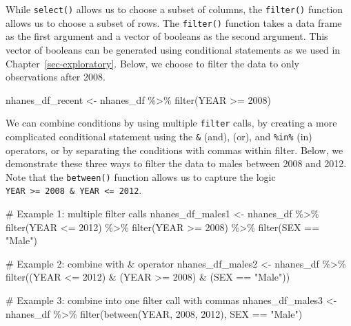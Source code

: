 \documentclass[
  letterpaper,
]{krantz}
\makeatletter
\newenvironment{Shaded}{\begin{snugshade}}{\end{snugshade}}
\newcommand{\CommentTok}[1]{\textcolor[rgb]{0.37,0.37,0.37}{#1}}
\newcommand{\DecValTok}[1]{\textcolor[rgb]{0.68,0.00,0.00}{#1}}
\newcommand{\FunctionTok}[1]{\textcolor[rgb]{0.28,0.35,0.67}{#1}}
\newcommand{\NormalTok}[1]{\textcolor[rgb]{0.00,0.23,0.31}{#1}}
\newcommand{\OtherTok}[1]{\textcolor[rgb]{0.00,0.23,0.31}{#1}}
\newcommand{\SpecialCharTok}[1]{\textcolor[rgb]{0.37,0.37,0.37}{#1}}
\newcommand{\StringTok}[1]{\textcolor[rgb]{0.13,0.47,0.30}{#1}}
\newenvironment{kframe}{%
\medskip{}
\setlength{\fboxsep}{.8em}
 \def\at@end@of@kframe{}%
 \ifinner\ifhmode%
  \def\at@end@of@kframe{\end{minipage}}%
  \begin{minipage}{\columnwidth}%
 \fi\fi%
 \def\FrameCommand##1{\hskip\@totalleftmargin \hskip-\fboxsep
 \colorbox{shadecolor}{##1}\hskip-\fboxsep
     \hskip-\linewidth \hskip-\@totalleftmargin \hskip\columnwidth}%
 \MakeFramed {\advance\hsize-\width
   \@totalleftmargin\z@ \linewidth\hsize
   \@setminipage}}%
 {\par\unskip\endMakeFramed%
 \at@end@of@kframe}
\renewenvironment{Shaded}{\begin{kframe}}{\end{kframe}}
\makeatother
\begin{document}
While \texttt{select()} allows us to choose a subset of columns, the
\texttt{filter()} function allows us to choose a subset of rows. The
\texttt{filter()} function takes a data frame as the first argument and
a vector of booleans as the second argument. This vector of booleans can
be generated using conditional statements as we used in
Chapter~\ref{sec-exploratory}. Below, we choose to filter the data to
only observations after 2008.

\begin{Shaded}
\begin{Highlighting}[]
\NormalTok{nhanes\_df\_recent }\OtherTok{\textless{}{-}}\NormalTok{ nhanes\_df }\SpecialCharTok{\%\textgreater{}\%} \FunctionTok{filter}\NormalTok{(YEAR }\SpecialCharTok{\textgreater{}=} \DecValTok{2008}\NormalTok{)}
\end{Highlighting}
\end{Shaded}

We can combine conditions by using multiple \texttt{filter} calls, by
creating a more complicated conditional statement using the \texttt{\&}
(and), \texttt{\textbar{}} (or), and \texttt{\%in\%} (in) operators, or
by separating the conditions with commas within filter. Below, we
demonstrate these three ways to filter the data to males between 2008
and 2012. Note that the \texttt{between()} function allows us to capture
the logic
\texttt{YEAR\ \textgreater{}=\ 2008\ \&\ YEAR\ \textless{}=\ 2012}.

\begin{Shaded}
\begin{Highlighting}[]
\CommentTok{\# Example 1: multiple filter calls}
\NormalTok{nhanes\_df\_males1 }\OtherTok{\textless{}{-}}\NormalTok{ nhanes\_df }\SpecialCharTok{\%\textgreater{}\%}
  \FunctionTok{filter}\NormalTok{(YEAR }\SpecialCharTok{\textless{}=} \DecValTok{2012}\NormalTok{) }\SpecialCharTok{\%\textgreater{}\%}
  \FunctionTok{filter}\NormalTok{(YEAR }\SpecialCharTok{\textgreater{}=} \DecValTok{2008}\NormalTok{) }\SpecialCharTok{\%\textgreater{}\%}
  \FunctionTok{filter}\NormalTok{(SEX }\SpecialCharTok{==} \StringTok{"Male"}\NormalTok{)}

\CommentTok{\# Example 2: combine with \& operator}
\NormalTok{nhanes\_df\_males2 }\OtherTok{\textless{}{-}}\NormalTok{ nhanes\_df }\SpecialCharTok{\%\textgreater{}\%}
  \FunctionTok{filter}\NormalTok{((YEAR }\SpecialCharTok{\textless{}=} \DecValTok{2012}\NormalTok{) }\SpecialCharTok{\&}\NormalTok{ (YEAR }\SpecialCharTok{\textgreater{}=} \DecValTok{2008}\NormalTok{) }\SpecialCharTok{\&}\NormalTok{ (SEX }\SpecialCharTok{==} \StringTok{"Male"}\NormalTok{))}

\CommentTok{\# Example 3: combine into one filter call with commas}
\NormalTok{nhanes\_df\_males3 }\OtherTok{\textless{}{-}}\NormalTok{ nhanes\_df }\SpecialCharTok{\%\textgreater{}\%}
  \FunctionTok{filter}\NormalTok{(}\FunctionTok{between}\NormalTok{(YEAR, }\DecValTok{2008}\NormalTok{, }\DecValTok{2012}\NormalTok{), SEX }\SpecialCharTok{==} \StringTok{"Male"}\NormalTok{)}
\end{Highlighting}
\end{Shaded}
\end{document}
